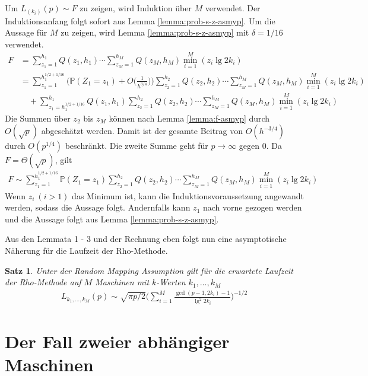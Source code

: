 \documentclass[a4paper, 11pt, ngerman]{article}
\renewcommand{\P}{\mathbb{P}}
\theoremstyle{definition}
\theoremstyle{plain}
\newtheorem{theorem}{Satz}
\theoremstyle{remark}
\begin{document}
Um $L_{(k_i)}(p) \sim F$ zu zeigen, wird Induktion über $M$ verwendet. Der Induktionsanfang folgt sofort aus Lemma \ref{lemma:prob-s-z-asmyp}. Um die Aussage für $M$ zu zeigen, wird Lemma \ref{lemma:prob-s-z-asmyp} mit $\delta = 1/16$ verwendet.
\begin{align*}
    F & = \sum_{z_1 = 1}^{h_1} Q(z_1, h_1) \cdots
    \sum_{z_M = 1}^{h_M} Q(z_M, h_M)
    \min_{i = 1}^M(z_i \lg 2k_i)                  \\
      & = \sum_{z_1 = 1}^{h_1^{1/2 + 1/16}}
    \Bigg (\P(Z_1 = z_1) + O \bigg (\frac 1 {h^{3/4}} \bigg ) \Bigg )
    \sum_{z_2 = 1}^{h_2} Q(z_2, h_2) \cdots
    \sum_{z_M = 1}^{h_M} Q(z_M, h_M)
    \min_{i = 1}^M(z_i \lg 2k_i)                  \\
      & \quad +
    \sum_{z_1 = h_1^{1/2 + 1/16}}^{h_1} Q(z_1, h_1)
    \sum_{z_2 = 1}^{h_2} Q(z_2, h_2) \cdots
    \sum_{z_M = 1}^{h_M} Q(z_M, h_M)
    \min_{i = 1}^M(z_i \lg 2k_i)
\end{align*}
Die Summen über $z_2$ bis $z_M$ können nach Lemma \ref{lemma:f-asmyp} durch $O(\sqrt p)$ abgeschätzt werden. Damit ist der gesamte Beitrag von $O(h^{-3/4})$ durch $O(p^{1/4})$ beschränkt. Die zweite Summe geht für $p \to \infty$ gegen 0. Da $F = \Theta(\sqrt p)$, gilt
\begin{align*}
    F \sim
    \sum_{z_1 = 1}^{h_1^{1/2 + 1/16}} \P(Z_1 = z_1)
    \sum_{z_2 = 1}^{h_2} Q(z_2, h_2) \cdots
    \sum_{z_M = 1}^{h_M} Q(z_M, h_M)
    \min_{i = 1}^M(z_i \lg 2k_i)
\end{align*}
Wenn $z_i \ (i > 1)$ das Minimum ist, kann die Induktionsvoraussetzung angewandt werden, sodass die Aussage folgt. Andernfalls kann $z_1$ nach vorne gezogen werden und die Aussage folgt aus Lemma \ref{lemma:prob-s-z-asmyp}.

Aus den Lemmata 1 - 3 und der Rechnung eben folgt nun eine asymptotische Näherung für die Laufzeit der Rho-Methode.
\begin{theorem}
    Unter der Random Mapping Assumption gilt für die erwartete Laufzeit der Rho-Methode auf $M$ Maschinen mit $k$-Werten $k_1, \dots, k_M$
    \begin{align*}
        L_{k_1, \dots, k_M}(p) \sim
        \sqrt{\pi p / 2} \Bigg ( \sum_{i = 1}^M
        \frac {\gcd(p - 1, 2k_i) - 1} {\lg^2 2k_i} \Bigg )^{-1/2}
    \end{align*}
\end{theorem}


\section{Der Fall zweier abhängiger Maschinen}
\label{sec:dep-machines}
\end{document}
